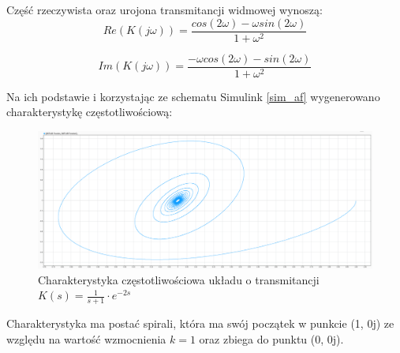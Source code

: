 \documentclass[12pt]{article}
\begin{document}
Część rzeczywista oraz urojona transmitancji widmowej wynoszą:
\begin{equation}
    Re(K(j\omega)) = \frac{cos(2\omega) - \omega sin (2\omega)}{1+\omega^2}
\end{equation}

\begin{equation}
    Im(K(j\omega)) = \frac{- \omega cos(2\omega)-sin(2\omega)}{1+\omega^2}
\end{equation}

Na ich podstawie i korzystając ze schematu Simulink \ref{sim_af} wygenerowano charakterystykę częstotliwościową:

\begin{figure}[H]
    \centering
    \includegraphics[scale=0.25]{kreciolek.png}
    \caption{Charakterystyka częstotliwościowa układu o transmitancji $K(s) =\frac{1}{s+1} \cdot e^{-2s }$ }
\end{figure}

Charakterystyka ma postać spirali, która ma swój początek w punkcie (1, 0j) ze względu na wartość wzmocnienia $k = 1$ oraz zbiega do punktu (0, 0j).
\end{document}
